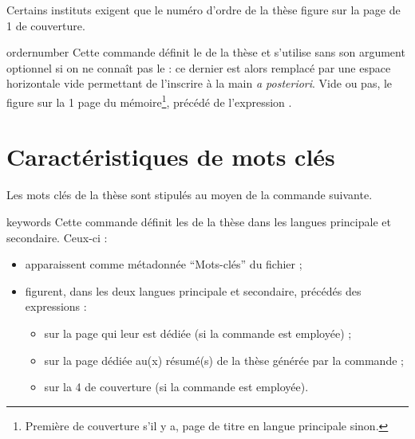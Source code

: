Certains instituts exigent que le numéro d'ordre de la thèse figure sur la page
de 1\iere{} de couverture.

\begin{docCommand}{ordernumber}{}
  Cette commande définit le  de la thèse et s'utilise sans
  son argument optionnel si on ne connaît pas  le  : ce dernier est alors remplacé par une espace horizontale vide
  permettant de l'inscrire à la main \emph{a posteriori}. Vide ou pas, le
   figure sur  la 1\iere{} page du
  mémoire\footnote{Première de couverture s'il y a, page de titre en langue
    principale sinon.}, précédé de l'expression
  .
\end{docCommand}

\section{Caractéristiques de mots clés}
\label{sec-proprietes-de-mots}

Les mots clés de la thèse sont stipulés au moyen de la commande
 suivante.
%
\begin{docCommand}[doc description=\mandatory]{keywords}{}
  Cette commande définit les  de la thèse dans
  les langues principale et secondaire. Ceux-ci :
  \begin{itemize}
  \item apparaissent comme métadonnée \enquote{Mots-clés} du fichier \pdf{} ;
  \item figurent, dans les deux langues principale et secondaire, précédés des
    expressions  :
    \begin{itemize}
    \item sur la page qui leur est dédiée (si la commande 
      est employée) ;
    \item sur la page dédiée au(x) résumé(s) de la thèse générée par la
      commande  ;
    \item sur la 4\ieme{} de couverture (si la commande 
      est employée).
    \end{itemize}
  \end{itemize}
\end{docCommand}

